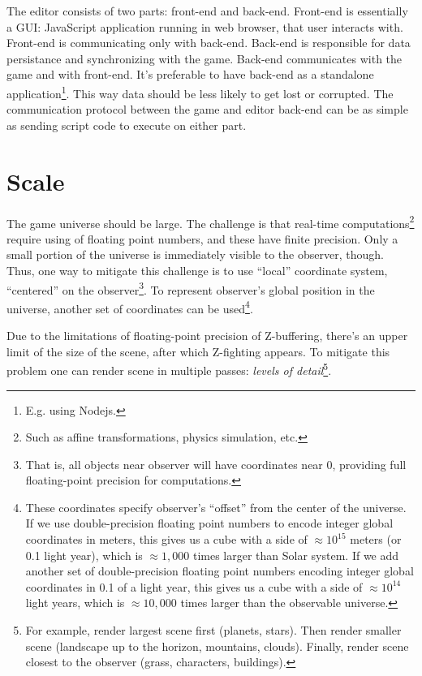 \documentclass[12pt]{article}
\begin{document}
The editor consists of two parts: front-end and back-end.
Front-end is essentially a GUI: JavaScript application running in web
browser, that user interacts with.
Front-end is communicating only with back-end.
Back-end is responsible for data persistance and synchronizing with the game.
Back-end communicates with the game and with front-end.
It's preferable to have back-end as a standalone application\footnote{
    E.g. using Nodejs.
}.
This way data should be less likely to get lost or corrupted.
The communication protocol between the game and editor back-end can be
as simple as sending script code to execute on either part.

\section{Scale}

The game universe should be large.
The challenge is that real-time computations\footnote{
    Such as affine transformations, physics simulation, etc.
} require using of floating point numbers, and these have finite precision.
Only a small portion of the universe is immediately visible to the observer,
though.
Thus, one way to mitigate this challenge is to use ``local'' coordinate system,
``centered'' on the observer\footnote{
    That is, all objects near observer will have coordinates near \(0\),
    providing full floating-point precision for computations.
}.
To represent observer's global position in the universe, another set of
coordinates can be used\footnote{
    These coordinates specify observer's ``offset'' from the center of the
    universe.
    If we use double-precision floating point numbers to encode integer
    global coordinates in meters, this gives us a cube with a side of
    \(\approx 10^{15}\) meters (or 0.1 light year), which is \(\approx 1,000\)
    times larger than Solar system.
    If we add another set of double-precision floating point numbers encoding
    integer global coordinates in 0.1 of a light year, this gives us a cube
    with a side of \(\approx 10^{14}\) light years, which is \(\approx 10,000\)
    times larger than the observable universe.
}.

Due to the limitations of floating-point precision of Z-buffering, there's an
upper limit of the size of the scene, after which Z-fighting appears.
To mitigate this problem one can render scene in multiple passes:
\emph{levels of detail}\footnote{
    For example, render largest scene first (planets, stars).
    Then render smaller scene (landscape up to the horizon, mountains, clouds).
    Finally, render scene closest to the observer
    (grass, characters, buildings).
}.
\end{document}
